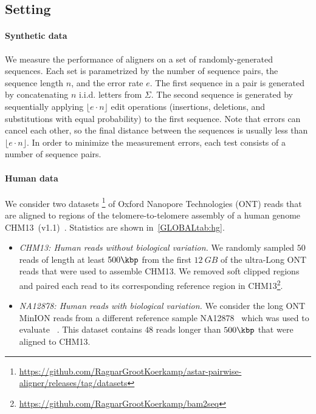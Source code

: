 \subsection{Setting} \label{GLOBALsec:evals-setup}

\paragraph{Synthetic data}
We measure the performance of aligners on a set of randomly-generated sequences.
Each set is parametrized by the number of sequence pairs, the sequence length
$n$, and the error rate $e$. The first sequence in a pair is generated by
concatenating $n$ i.i.d. letters from $\Sigma$. The second sequence is generated
by sequentially applying $\lfloor e{\cdot} n\rfloor$ edit operations (insertions,
deletions, and substitutions with equal probability) to the first sequence. Note
that errors can cancel each other, so the final distance between the sequences
is usually less than $\lfloor e{\cdot} n \rfloor$. In order to minimize the
measurement errors, each test consists of a number of sequence pairs.

\paragraph{Human data}
We consider two datasets%
\footnote{\url{https://github.com/RagnarGrootKoerkamp/astar-pairwise-aligner/releases/tag/datasets}}
of Oxford Nanopore Technologies (ONT) reads that are aligned to regions of the
telomere-to-telomere assembly of a human genome
CHM13~(v1.1)~\citep{nurk2022complete}. Statistics are shown in~\cref{GLOBALtab:hg}.

\begin{itemize}
  \item \emph{CHM13: Human reads without biological variation.} We randomly
        sampled $50$ reads of length at least $500\kbp$ from the first
        $\qty{12}{GB}$ of the ultra-Long ONT reads that were used to assemble
        CHM13. We removed soft clipped regions and paired each read to its
        corresponding reference region in CHM13\footnote{\url{https://github.com/RagnarGrootKoerkamp/bam2seq}}.
  \item \emph{NA12878: Human reads with biological variation.} We consider the
        long ONT MinION reads from a different reference sample
        NA12878~\citep{bowden2019sequencing} which was used to evaluate
        \wfa~\citep{marco2022optimal}. This dataset contains $48$ reads longer than
        $500\kbp$ that were aligned to CHM13.
\end{itemize}

